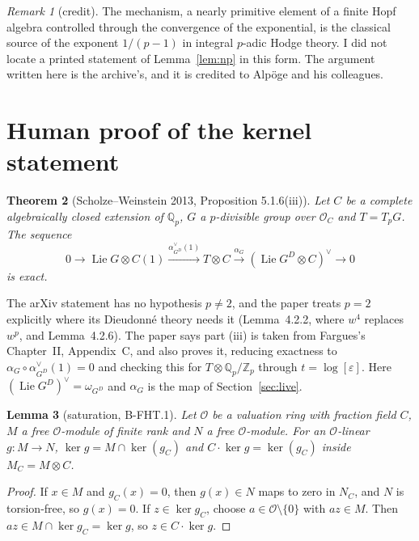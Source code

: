 \documentclass[11pt]{article}
\newtheorem{theorem}{Theorem}
\newtheorem{lemma}[theorem]{Lemma}
\theoremstyle{definition}
\theoremstyle{remark}
\newtheorem{remark}[theorem]{Remark}
\newcommand{\cO}{\mathcal O}
\begin{document}
\begin{remark}[credit]
The mechanism, a nearly primitive element of a finite Hopf algebra controlled through the convergence of the exponential, is the classical source of the exponent $1/(p-1)$ in integral $p$-adic Hodge theory. I did not locate a printed statement of Lemma~\ref{lem:np} in this form. The argument written here is the archive's, and it is credited to Alpöge and his colleagues.
\end{remark}

\section{Human proof of the kernel statement}\label{sec:ii}

\begin{theorem}[Scholze--Weinstein 2013, Proposition 5.1.6(iii)]\label{thm:SW}
Let $C$ be a complete algebraically closed extension of $\mathbb Q_p$, $G$ a $p$-divisible group over $\cO_C$ and $T=T_pG$. The sequence
\[
0\to\operatorname{Lie}G\otimes C(1)\xrightarrow{\alpha_{G^D}^\vee(1)}T\otimes C\xrightarrow{\alpha_G}(\operatorname{Lie}G^D\otimes C)^\vee\to0
\]
is exact.
\end{theorem}

The arXiv statement has no hypothesis $p\ne2$, and the paper treats $p=2$ explicitly where its Dieudonné theory needs it (Lemma~4.2.2, where $w^4$ replaces $w^p$, and Lemma~4.2.6). The paper says part (iii) is taken from Fargues's Chapter~II, Appendix~C, and also proves it, reducing exactness to $\alpha_G\circ\alpha_{G^D}^\vee(1)=0$ and checking this for $T\otimes\mathbb Q_p/\mathbb Z_p$ through $t=\log[\varepsilon]$. Here $(\operatorname{Lie}G^D)^\vee=\omega_{G^D}$ and $\alpha_G$ is the map of Section~\ref{sec:live}.

\begin{lemma}[saturation, B-FHT.1]\label{lem:sat}
Let $\cO$ be a valuation ring with fraction field $C$, $M$ a free $\cO$-module of finite rank and $N$ a free $\cO$-module. For an $\cO$-linear $g\colon M\to N$, $\ker g=M\cap\ker(g_C)$ and $C\cdot\ker g=\ker(g_C)$ inside $M_C=M\otimes C$.
\end{lemma}

\begin{proof}
If $x\in M$ and $g_C(x)=0$, then $g(x)\in N$ maps to zero in $N_C$, and $N$ is torsion-free, so $g(x)=0$. If $z\in\ker g_C$, choose $a\in\cO\setminus\{0\}$ with $az\in M$. Then $az\in M\cap\ker g_C=\ker g$, so $z\in C\cdot\ker g$.
\end{proof}
\end{document}
